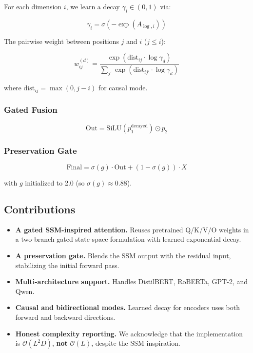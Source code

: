 For each dimension $i$, we learn a decay $\gamma_i \in (0, 1)$ via:

\[
\gamma_i = \sigma(-\exp(A_{\log, i}))
\tag{1.2}
\]

The pairwise weight between positions $j$ and $i$ ($j \leq i$):

\[
w_{ij}^{(d)} = \frac{\exp(\text{dist}_{ij} \cdot \log \gamma_d)}{\sum_{j'} \exp(\text{dist}_{ij'} \cdot \log \gamma_d)}
\tag{1.3}
\]

where $\text{dist}_{ij} = \max(0, j - i)$ for causal mode.

\subsubsection{Gated Fusion}

\[
\text{Out} = \text{SiLU}(p_1^\text{decayed}) \odot p_2
\tag{1.4}
\]

\subsubsection{Preservation Gate}

\[
\text{Final} = \sigma(g) \cdot \text{Out} + (1 - \sigma(g)) \cdot X
\tag{1.5}
\]

with $g$ initialized to 2.0 (so $\sigma(g) \approx 0.88$).

\subsection{Contributions}

\begin{itemize}
\item \textbf{A gated SSM-inspired attention.} Reuses pretrained Q/K/V/O weights in a
  two-branch gated state-space formulation with learned exponential decay.
\item \textbf{A preservation gate.} Blends the SSM output with the residual input,
  stabilizing the initial forward pass.
\item \textbf{Multi-architecture support.} Handles DistilBERT, RoBERTa, GPT-2, and
  Qwen.
\item \textbf{Causal and bidirectional modes.} Learned decay for encoders uses both
  forward and backward directions.
\item \textbf{Honest complexity reporting.} We acknowledge that the implementation is
  $\mathcal{O}(L^2 D)$, \textbf{not} $\mathcal{O}(L)$, despite the SSM inspiration.

\end{itemize}
